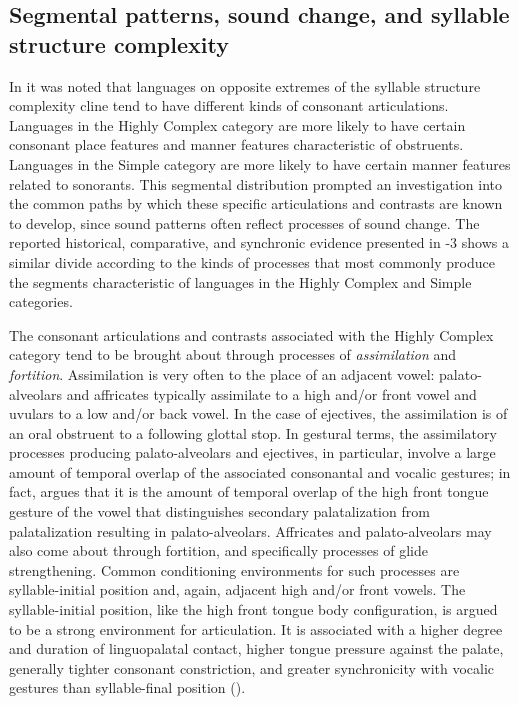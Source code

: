 \subsection{Segmental patterns, sound change, and syllable structure complexity}\label{sec:4.5.4}

  In  it was noted that languages on opposite extremes of the syllable structure complexity cline tend to have different kinds of consonant articulations. Languages in the Highly Complex category are more likely to have certain consonant place features and manner features characteristic of obstruents. Languages in the Simple category are more likely to have certain manner features related to sonorants. This segmental distribution prompted an investigation into the common paths by which these specific articulations and contrasts are known to develop, since sound patterns often reflect processes of sound change. The reported historical, comparative, and synchronic evidence presented in -3 shows a similar divide according to the kinds of processes that most commonly produce the segments characteristic of languages in the Highly Complex and Simple categories.

  The consonant articulations and contrasts associated with the Highly Complex category tend to be brought about through processes of \textit{assimilation} and \textit{fortition}. Assimilation is very often to the place of an adjacent vowel: palato-alveolars and affricates typically assimilate to a high and/or front vowel and uvulars to a low and/or back vowel. In the case of ejectives, the assimilation is of an oral obstruent to a following glottal stop. In gestural terms, the assimilatory processes producing palato-alveolars and ejectives, in particular, involve a large amount of temporal overlap of the associated consonantal and vocalic gestures; in fact, \citet{Bateman2007} argues that it is the amount of temporal overlap of the high front tongue gesture of the vowel that distinguishes secondary palatalization from palatalization resulting in palato-alveolars. Affricates and palato-alveolars may also come about through fortition, and specifically processes of glide strengthening. Common conditioning environments for such processes are syllable-initial position and, again, adjacent high and/or front vowels. The syllable-initial position, like the high front tongue body configuration, is argued to be a strong environment for articulation. It is associated with a higher degree and duration of linguopalatal contact, higher tongue pressure against the palate, generally tighter consonant constriction, and greater synchronicity with vocalic gestures than syllable-final position (\citealt{Byrd1996b,Fougeron1999,KeatingEtAl2003,GoldsteinEtAl2006}).

